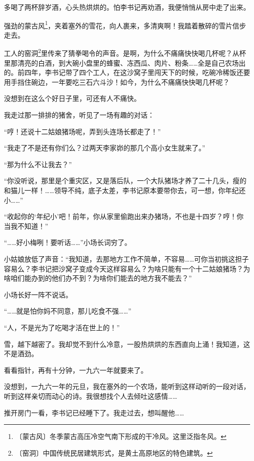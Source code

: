 \documentclass[12pt,UTF-8,openany]{ctexbook}
\begin{document}
\begin{large}
    
    多喝了两杯辞岁酒，心头热烘烘的。怕李书记再劝酒，我便悄悄从房中走了出来。
    
    强劲的蒙古风\footnote{〔蒙古风〕冬季蒙古高压冷空气南下形成的干冷风。这里泛指冬风。}，夹着塞外的雪花，向人裹来，多清爽啊！我踏着散碎的雪片信步走去。
    
    工人的窑洞\footnote{〔窑洞〕中国传统民居建筑形式，是黄土高原地区的特色建筑。}里传来了猜拳喝令的声音。是啊，为什么不痛痛快快喝几杯呢？从杯里那清亮的白酒，到大碗小盘里的蜂蜜、冻西瓜、肉片、粉条……全是自己农场出的。前四年，李书记带了四个工人，在这沙窝子里闯天下的时候，吃碗冷稀饭还要用手挡住碗边，一年要吃三石六斗沙！如今，为什么不痛痛快快喝几杯呢？
    
    没想到在这么个好日子里，可还有人不痛快。
    
    我走过那一排排的猪舍，听见了一场有趣的对话：
    
    “哼！还说十二姑娘猪场呢，弄到头连场长都走了！”
    
    “我走了不是还有你们么？过两天李家峁的那几个高小女生就来了。”
    
    “那为什么不让我去？”
    
    “你没听说，那里是个重灾区，又是落后队，一个大队猪场才养了二十几头，瘦的和猫儿一样！……领导不纯，底子太差，李书记原本要带你去，可一想，你年纪还小……”
    
    “收起你的‘年纪小’吧！前年，你从家里偷跑出来办猪场，不也是十四岁？哼！你当我不知道！”
    
    “……好小梅咧！要听话……”小场长词穷了。
    
    小姑娘放低了声音：“我知道，去那地方工作不简单，不容易……可你当初挑这担子容易么？李书记把沙窝子变成今天这样容易么？为啥只能有一个十二姑娘猪场？为啥咱们能办到的他们办不到？为啥你们能去的地方我不能去？”
    
    小场长好一阵不说话。
    
    “……就是怕你妈不同意，那儿吃食不强……”
    
    “人，不是光为了吃喝才活在世上的！”
    
    雪，越下越密了。我却觉不到什么冷意，一股热烘烘的东西直向上涌！我知道，这不是酒劲。
    
    看看指针，再有十分钟，一九六一年就要来了。
    
    没想到，一九六一年的元旦，我在塞外的一个农场，能听到这样动听的一段对话，听到这样亲切而动心的诗。我很想找个人去倾吐这感情……
    
    推开房门一看，李书记已经睡下了。我走过去，想叫醒他……
    

\end{large}
\end{document}
